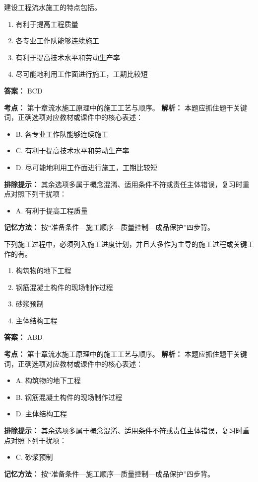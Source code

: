 \documentclass[UTF8,fontset=fandol,11pt]{ctexart}
\begin{document}
\begin{quizbox}[title={第 17 题}]
建设工程流水施工的特点包括。\\
\begin{enumerate}[label=\Alph*.]
\item 有利于提高工程质量
\item 各专业工作队能够连续施工
\item 有利于提高技术水平和劳动生产率
\item 尽可能地利用工作面进行施工，工期比较短
\end{enumerate}
\textbf{答案：} BCD
\vspace{0.25em}
\begin{answerbox}[title={考点解析}]
\textbf{考点：} 第十章流水施工原理中的施工工艺与顺序。
\textbf{解析：} 本题应抓住题干关键词，正确选项对应教材或课件中的核心表述：
\begin{itemize}
\item B. 各专业工作队能够连续施工
\item C. 有利于提高技术水平和劳动生产率
\item D. 尽可能地利用工作面进行施工，工期比较短
\end{itemize}
\textbf{排除提示：} 其余选项多属于概念混淆、适用条件不符或责任主体错误，复习时重点对照下列干扰项：
\begin{itemize}
\item A. 有利于提高工程质量
\end{itemize}
\textbf{记忆方法：} 按“准备条件—施工顺序—质量控制—成品保护”四步背。
\end{answerbox}
\end{quizbox}

\begin{quizbox}[title={第 18 题}]
下列施工过程中，必须列入施工进度计划，并且大多作为主导的施工过程或关键工作的有。\\
\begin{enumerate}[label=\Alph*.]
\item 构筑物的地下工程
\item 钢筋混凝土构件的现场制作过程
\item 砂浆预制
\item 主体结构工程
\end{enumerate}
\textbf{答案：} ABD
\vspace{0.25em}
\begin{answerbox}[title={考点解析}]
\textbf{考点：} 第十章流水施工原理中的施工工艺与顺序。
\textbf{解析：} 本题应抓住题干关键词，正确选项对应教材或课件中的核心表述：
\begin{itemize}
\item A. 构筑物的地下工程
\item B. 钢筋混凝土构件的现场制作过程
\item D. 主体结构工程
\end{itemize}
\textbf{排除提示：} 其余选项多属于概念混淆、适用条件不符或责任主体错误，复习时重点对照下列干扰项：
\begin{itemize}
\item C. 砂浆预制
\end{itemize}
\textbf{记忆方法：} 按“准备条件—施工顺序—质量控制—成品保护”四步背。
\end{answerbox}
\end{quizbox}
\end{document}
